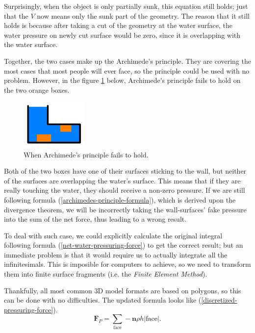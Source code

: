 Surprisingly, when the object is only partially sunk, this equation still holds;
just that the $V$ now means only the sunk part of the geometry.
The reason that it still holds is because after taking a cut of the geometry at the water surface, the water pressure on newly cut surface would be zero, since it is overlapping with the water surface.

Together, the two cases make up the Archimede's principle.
They are covering the most cases that most people will ever face, so the principle could be used with no problem.
However, in the figure \ref{archimedes-principle-failing-case} below, Archimede's principle fails to hold on the two orange boxes.

\begin{figure}[h]
	\begin{center}
		\includegraphics[width=1.3in]{figures/ap-blind-spot.png}
	\end{center}
	\caption{When Archimede's principle fails to hold.}
	\label{archimedes-principle-failing-case}
\end{figure}

Both of the two boxes have one of their surfaces sticking to the wall, but neither of the surfaces are overlapping the water's surface.
This means that if they are really touching the water, they should receive a non-zero pressure.
If we are still following formula (\ref{archimedes-principle-formula}), which is derived upon the divergence theorem, we will be incorrectly taking the wall-surfaces' fake pressure into the sum of the net force, thus leading to a wrong result.

To deal with such case, we could explicitly calculate the original integral following formula (\ref{net-water-pressuring-force}) to get the correct result; but an immediate problem is that it would require us to actually integrate all the infinitesimals.
This is imposible for computers to achieve, so we need to transform them into finite surface fragments (i.e. the \emph{Finite Element Method}).

Thankfully, all most common 3D model formats are based on polygons, so this can be done with no difficulties.
The updated formula looks like (\ref{discretized-pressuring-force}).
\begin{equation}
	\mathbf{F}_P=\sum_{\text{face}}-\mathbf{n}\rho h|\text{face}|.
	\label{discretized-pressuring-force}
\end{equation}

